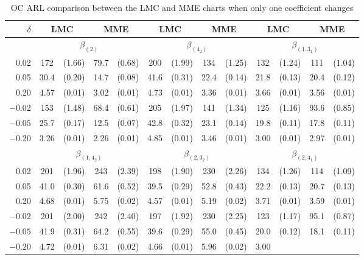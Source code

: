 \begin{table}[htp]
\tabcolsep 4.5pt \vspace{-0.1cm} \centering \caption{OC ARL comparison between the
LMC and MME charts when only one coefficient changes} \vspace{0.3cm}
\renewcommand{\arraystretch}{1.32}
\begin{tabular}{r|cccc|cccc|cccc}\hline
$\delta$ & \multicolumn{2}{c}{LMC} & \multicolumn{2}{c|}{MME} &
\multicolumn{2}{c}{LMC} & \multicolumn{2}{c|}{MME} & \multicolumn{2}{c}{LMC} &
\multicolumn{2}{c}{MME}
\\\hline
& \multicolumn{4}{c|}{$\beta_{(2)}$} & \multicolumn{4}{c|}{$\beta_{(4_2)}$} &
\multicolumn{4}{c}{$\beta_{(1,3_1)}$}
\\\hline
0.02 & 172 & (1.66) & 79.7 & (0.68) & 200 & (1.99) & 134 & (1.25) & 132 & (1.24) &
111 & (1.04)
\\
0.05 & 30.4 & (0.20) & 14.7 & (0.08) & 41.6 & (0.31) & 22.4 & (0.14) & 21.8 & (0.13)
& 20.4 & (0.12)
\\
0.20 & 4.57 & (0.01) & 3.02 & (0.01) & 4.73 & (0.01) & 3.36 & (0.01) & 3.66 & (0.01)
& 3.56 & (0.01)
\\
$-0.02$ & 153 & (1.48) & 68.4 & (0.61) & 205 & (1.97) & 141 & (1.34) & 125 & (1.16)
& 93.6 & (0.85)
\\
$-0.05$ & 25.7 & (0.17) & 12.5 & (0.07) & 42.8 & (0.32) & 23.1 & (0.14) & 19.8 &
(0.11) & 17.8 & (0.11)
\\
$-0.20$ & 3.26 & (0.01) & 2.26 & (0.01) & 4.85 & (0.01) & 3.46 & (0.01) & 3.00 &
(0.01) & 2.97 & (0.01)
\\\hline
& \multicolumn{4}{c|}{$\beta_{(1,4_2)}$} & \multicolumn{4}{c|}{$\beta_{(2,3_2)}$} &
\multicolumn{4}{c}{$\beta_{(2,4_1)}$}
\\\hline
0.02 & 201 & (1.96) & 243 & (2.39) & 198 & (1.90) & 230 & (2.26) & 134 & (1.26) &
114 & (1.09)
\\
0.05 & 41.0 & (0.30) & 61.6 & (0.52) & 39.5 & (0.29) & 52.8 & (0.43) & 22.2 & (0.13)
& 20.7 & (0.13)
\\
0.20 & 4.68 & (0.01) & 5.75 & (0.02) & 4.57 & (0.01) & 5.19 & (0.02) & 3.71 & (0.01)
& 3.59 & (0.01)
\\
$-0.02$ & 201 & (2.00) & 242 & (2.40) & 197 & (1.92) & 230 & (2.25) & 123 & (1.17) &
95.1 & (0.87)
\\
$-0.05$ & 41.9 & (0.31) & 64.2 & (0.55) & 39.6 & (0.29) & 55.0 & (0.45) & 20.0 &
(0.12) & 18.1 & (0.11)
\\
$-0.20$ & 4.72 & (0.01) & 6.31 & (0.02) & 4.66 & (0.01) & 5.96 & (0.02) & 3.00 &

\end{tabular}
\end{table}
